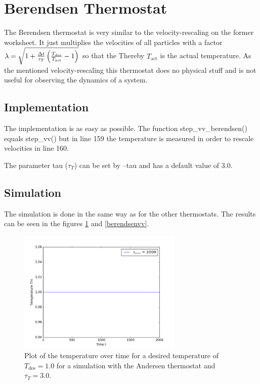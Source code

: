 \section{Berendsen Thermostat}

The Berendsen thermostat is very similar to the velocity-rescaling on the former worksheet.
It just multiplies the velocities of all particles with a factor $\lambda =\sqrt{1+\frac{\Delta t}{\tau_T}\left(\frac{T_\text{des}}{T_\text{act}}-1\right) }$ so that the 
Thereby $T_\text{act}$ is the actual temperature. 
As the mentioned velocity-rescaling this thermostat does no physical stuff and is not useful for observing the dynamics of a system.

\subsection{Implementation}

The implementation is as easy as possible.
The function step\_vv\_berendsen() equals step\_vv() but in line 159 the temperature is measured in order to rescale velocities in line 160.


The parameter tau ($\tau_T$) can be set by --tau and has a default value of 3.0.

\subsection{Simulation}

The simulation is done in the same way as for the other thermostats. 
The results can be seen in the figures \ref{berendsenT} and \ref{berendsenvv}.

\begin{figure}[ht]
	\centering
	\includegraphics[width=0.7\textwidth]{../dat/berendsen_T1d0_tau3d0_Tm.png}
	\caption{
		Plot of the temperature over time for a desired temperature of $T_\text{des}=1.0$ for a simulation with the Andersen thermostat and $\tau_T =3.0$.
	}
	\label{berendsenT}
\end{figure}

